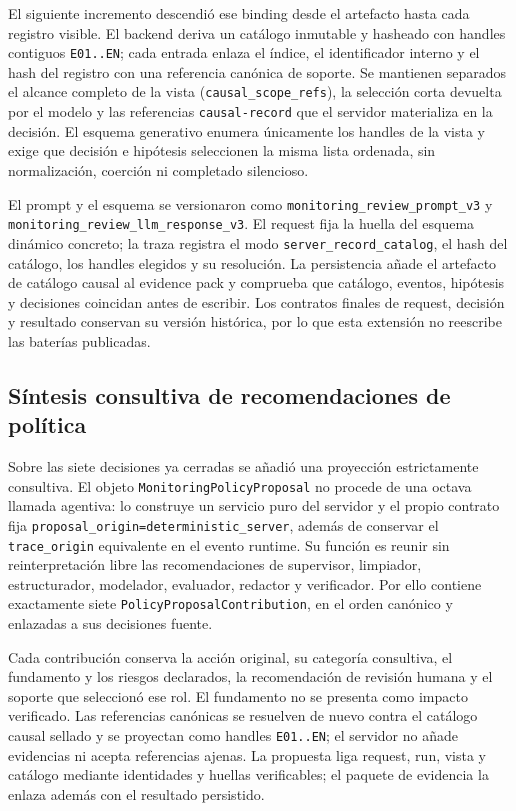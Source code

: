 El siguiente incremento descendió ese binding desde el artefacto hasta cada
registro visible. El backend deriva un catálogo inmutable y hasheado con handles
contiguos \texttt{E01..EN}; cada entrada enlaza el índice, el identificador
interno y el hash del registro con una referencia canónica de soporte. Se
mantienen separados el alcance completo de la vista
(\texttt{causal\_scope\_refs}), la selección corta devuelta por el modelo y las
referencias \texttt{causal-record} que el servidor materializa en la decisión.
El esquema generativo enumera únicamente los handles de la vista y exige que
decisión e hipótesis seleccionen la misma lista ordenada, sin normalización,
coerción ni completado silencioso.

El prompt y el esquema se versionaron como
\texttt{monitoring\_review\_prompt\_v3} y
\texttt{monitoring\_review\_llm\_response\_v3}. El request fija la huella del
esquema dinámico concreto; la traza registra el modo
\texttt{server\_record\_catalog}, el hash del catálogo, los handles elegidos y
su resolución. La persistencia añade el artefacto de catálogo causal al
evidence pack y comprueba
que catálogo, eventos, hipótesis y decisiones coincidan antes de escribir. Los
contratos finales de request, decisión y resultado conservan su versión
histórica, por lo que esta extensión no reescribe las baterías publicadas.

\subsection{Síntesis consultiva de recomendaciones de política}

Sobre las siete decisiones ya cerradas se añadió una proyección estrictamente
consultiva. El objeto \texttt{MonitoringPolicyProposal} no procede de una
octava llamada agentiva: lo construye un servicio puro del servidor y el propio
contrato fija
\nolinkurl{proposal_origin=deterministic_server}, además de conservar el
\texttt{trace\_origin} equivalente en el evento runtime. Su función es reunir
sin reinterpretación libre las recomendaciones de supervisor, limpiador,
estructurador, modelador, evaluador, redactor y verificador. Por ello contiene
exactamente siete \texttt{PolicyProposalContribution}, en el orden canónico y
enlazadas a sus decisiones fuente.

Cada contribución conserva la acción original, su categoría consultiva, el
fundamento y los riesgos declarados, la recomendación de revisión humana y el
soporte que seleccionó ese rol. El fundamento no se presenta como impacto
verificado. Las referencias canónicas se resuelven de nuevo contra el catálogo
causal sellado y se proyectan como handles \texttt{E01..EN}; el servidor no
añade evidencias ni acepta referencias ajenas. La propuesta liga request, run,
vista y catálogo mediante identidades y huellas verificables; el paquete de
evidencia la enlaza además con el resultado persistido.

